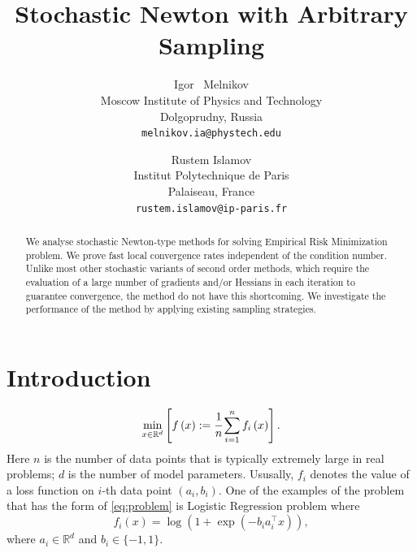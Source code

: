 \documentclass{article}
\title{Stochastic Newton with Arbitrary Sampling}
\author{ Igor ~Melnikov	\\
	Moscow Institute of Physics and Technology\\
	Dolgoprudny, Russia \\
	\texttt{melnikov.ia@phystech.edu} \\
	\and
	Rustem Islamov \\
	Institut Polytechnique de Paris\\
	Palaiseau, France \\
	\texttt{rustem.islamov@ip-paris.fr} \\
}
\begin{document}
\nocite{*}
\maketitle

\begin{abstract}
We analyse stochastic Newton-type methods for solving Empirical Risk Minimization problem. We prove fast local convergence rates independent of the condition number. Unlike most other stochastic variants of second order methods, which require the evaluation of a large number of gradients and/or Hessians in each iteration to guarantee convergence, the method do not have this shortcoming. We investigate the performance of the method by applying existing sampling strategies.
\end{abstract}

\section{Introduction}
\begin{equation}\label{eq:problem}
    \min\limits_{x\in \mathbb{R}^d} \left[f\left(x\right):=\cfrac{1}{n}\sum\limits_{i=1}^{n}f_i\left(x\right)\right].
\end{equation}
Here $n$ is the number of data points that is typically extremely large in real problems; $d$ is the number of model parameters. Ususally, $f_i$ denotes the value of a loss function on $i$-th data point $(a_i, b_i)$. One of the examples of the problem that has the form of \eqref{eq:problem} is Logistic Regression problem where
\begin{equation}
    f_i(x) = \log\left(1+\exp(-b_i a_i^\top x )\right),
\end{equation}
where $a_i \in \mathbb{R}^d$ and $b_i \in \{-1,1\}.$
\end{document}
